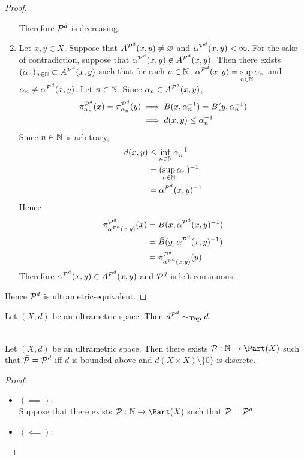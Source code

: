\documentclass{book}
\begin{document}
\begin{proof}
\begin{enumerate}
		Therefore $\mathcal{P}^d$ is decreasing.
		\item Let $x,y \in X$. Suppose that $A^{\mathcal{P}^d}(x,y) \neq \varnothing$ and $\alpha^{\mathcal{P}^d}(x,y) < \infty$. For the sake of contradiction, suppose that $\alpha^{\mathcal{P}^d}(x,y) \not \in A^{\mathcal{P}^d}(x,y)$. Then there exists $(\alpha_n)_{n \in \mathbb{N}} \subset A^{\mathcal{P}^d}(x,y)$ such that for each $n \in \mathbb{N}$, $\alpha^{\mathcal{P}^d}(x,y) = \sup\limits_{n \in \mathbb{N}} \alpha_n$ and $\alpha_n \neq \alpha^{\mathcal{P}^d}(x,y)$. Let $n \in \mathbb{N}$. Since $\alpha_n \in A^{\mathcal{P}^d}(x,y)$, 
		\begin{align*}
			\pi^{\mathcal{P}^d}_{\alpha_n}(x) = \pi^{\mathcal{P}^d}_{\alpha_n}(y)
			& \implies \bar{B}(x, \alpha_n^{-1}) = \bar{B}(y, \alpha_n^{-1}) \\
			& \implies d(x,y) \leq \alpha_n^{-1}
		\end{align*}
		Since $n \in \mathbb{N}$ is arbitrary, 
		\begin{align*}
			d(x,y)
			& \leq \inf_{n \in \mathbb{N}} \alpha_n^{-1} \\
			& = (\sup_{n \in \mathbb{N}} \alpha_n)^{-1} \\
			& = \alpha^{\mathcal{P}^d}(x,y)^{-1} 
		\end{align*}
		Hence 
		\begin{align*}
			\pi^{\mathcal{P}^d}_{\alpha^{\mathcal{P}^d}(x,y)}(x)
			& = \bar{B}(x, \alpha^{\mathcal{P}^d}(x,y)^{-1}) \\
			& = \bar{B}(y, \alpha^{\mathcal{P}^d}(x,y)^{-1}) \\
			& = \pi^{\mathcal{P}^d}_{\alpha^{\mathcal{P}^d}(x,y)}(y)
		\end{align*}
		Therefore $\alpha^{\mathcal{P}^d}(x,y) \in A^{\mathcal{P}^d}(x,y)$ and $\mathcal{P}^d$ is left-continuous
	\end{enumerate}
	Hence $\mathcal{P}^d$ is ultrametric-equivalent.
\end{proof}

\begin{ex}
	Let $(X, d)$ be an ultrametric space. Then $d^{\mathcal{P}^d} \sim_{\operatorname*{\text{\textbf{Top}}}} d$. \\
\end{ex}



\begin{ex}  \\
	Let $(X, d)$ be an ultrametric space. Then there exists $\MP: \N \rightarrow \Part(X)$ such that $\bar{\mathcal{P}} = \mathcal{P}^d$ iff $d$ is bounded above and $d(X \times X) \setminus \{0\}$ is discrete. 
\end{ex}

\begin{proof}\
	\begin{itemize}
		\item $(\implies): $ \\
		Suppose that there exists $\MP: \N \rightarrow \Part(X)$ such that $\bar{\mathcal{P}} = \mathcal{P}^d$ 
		\item $(\impliedby): $ \\
	\end{itemize}
\end{proof}
\end{document}

